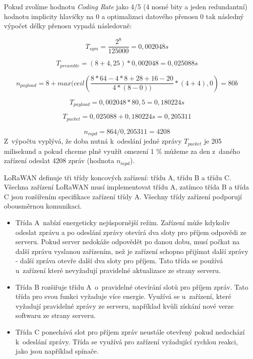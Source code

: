 Pokud zvolíme hodnotu \textit{Coding Rate} jako 4/5 (4 nosné bity a jeden redundantní) hodnotu implicity hlavičky na 0 a optimalizaci datového přenosu 0 tak následný výpočet délky přenosu vypadá následovně:

\begin{equation*}
    T_{sym} = \frac{2^{8}}{125000} = 0,002048s 
\end{equation*}

\begin{equation*}
    T_{preamble} = (8+4,25)*0,002048 = 0,025088s 
\end{equation*}

\begin{equation*}
    n_{payload} = 8+max(ceil(\frac{8*64-4*8+28+16-20}{4*(8-0))}*(4+4), 0) = 80b 
\end{equation*}

\begin{equation*}
    T_{payload} = 0,002048*80,5 = 0,180224s 
\end{equation*}

\begin{equation*}
    T_{packet} = 0,025088 + 0,180224s = 0,205311 
\end{equation*}

\begin{equation*}
    n_{mpd} = 864/0,205311 = 4208
\end{equation*}
Z~výpočtu vyplývá, že doba nutná k~odeslání jedné zprávy $T_{packet}$ je 205 milisekund a pokud chceme plně využít omezení 1 \% můžeme za den z~daného zařízení odeslat 4208 zpráv (hodnota $n_{mpd}$).

LoRaWAN definuje tři třídy koncových zařízení: třídu A, třídu B a třídu C. Všechna zařízení LoRaWAN musí implementovat třídu A, zatímco třída B a třída C jsou rozšířením specifikace zařízení třídy A. Všechny třídy zařízení podporují obousměrnou komunikaci.
\begin{itemize}
    \item Třída A~nabízí energeticky nejúspornější režim. Zařízení může kdykoliv odeslat zprávu a po odeslání zprávy otevírá dva sloty pro příjem odpovědi ze serveru. Pokud server nedokáže odpovědět po danou dobu, musí počkat na další zprávu vyslanou zařízením, než je zařízení schopno přijímat další zprávy - další zpráva otevře další dva sloty pro příjem. Tato třída se používá u~zařízení které nevyžadují pravidelné aktualizace ze strany serveru.
    \item Třída B rozšiřuje třídu A~o~pravidelné otevírání slotů pro příjem zpráv. Tato třída pro svou funkci vyžaduje více energie. Využívá se u~zařízení, které vyžadují pravidelné zprávy ze serveru, například kvůli získání nové verze softwaru ze strany serveru.
    \item Třída C ponechává slot pro příjem zpráv neustále otevřený pokud nedochází k~odeslání zprávy. Třída se využívá pro zařízení vyžadující rychlou reakci, jako jsou například spínače. 
\end{itemize}

